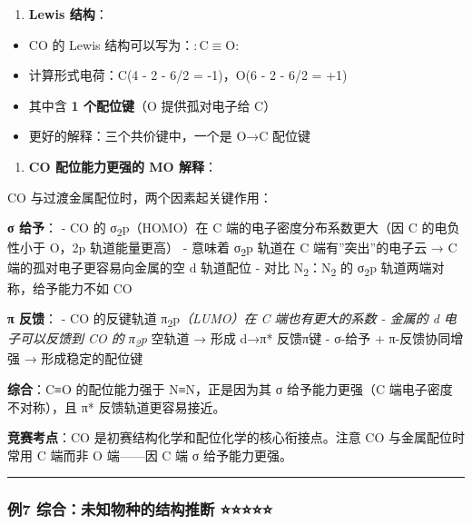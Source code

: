 \documentclass[a4paper,11pt]{ctexart}
\providecommand{\tightlist}{\setlength{\itemsep}{0pt}\setlength{\parskip}{0pt}}
\begin{document}
\begin{enumerate}
\def\labelenumi{(\arabic{enumi})}
\setcounter{enumi}{2}
\tightlist
\item
  \textbf{Lewis 结构}：
\end{enumerate}

\begin{itemize}
\tightlist
\item
  CO 的 Lewis 结构可以写为：\(\mathrm{:C≡O:}\)
\item
  计算形式电荷：C(4 - 2 - 6/2 = -1)，O(6 - 2 - 6/2 = +1)
\item
  其中含 \textbf{1 个配位键}（O 提供孤对电子给 C）
\item
  更好的解释：三个共价键中，一个是 O→C 配位键
\end{itemize}

\begin{enumerate}
\def\labelenumi{(\arabic{enumi})}
\setcounter{enumi}{3}
\tightlist
\item
  \textbf{CO 配位能力更强的 MO 解释}：
\end{enumerate}

CO 与过渡金属配位时，两个因素起关键作用：

\textbf{σ 给予}：
- CO 的 σ\textsubscript{2}p（HOMO）在 C 端的电子密度分布系数更大（因 C 的电负性小于 O，2p 轨道能量更高）
- 意味着 σ\textsubscript{2}p 轨道在 C 端有''突出''的电子云 → C 端的孤对电子更容易向金属的空 d 轨道配位
- 对比 N\textsubscript{2}：N\textsubscript{2} 的 σ\textsubscript{2}p 轨道两端对称，给予能力不如 CO

\textbf{π 反馈}：
- CO 的反键轨道 π\textsubscript{2}p\emph{（LUMO）在 C 端也有更大的系数
- 金属的 d 电子可以反馈到 CO 的 π\textsubscript{2}p} 空轨道 → 形成 d→π* 反馈π键
- σ-给予 + π-反馈协同增强 → 形成稳定的配位键

\textbf{综合}：C≡O 的配位能力强于 N≡N，正是因为其 σ 给予能力更强（C 端电子密度不对称），且 π* 反馈轨道更容易接近。

\textbf{竞赛考点}：CO 是初赛结构化学和配位化学的核心衔接点。注意 CO 与金属配位时常用 C 端而非 O 端------因 C 端 σ 给予能力更强。

\begin{center}\rule{0.5\linewidth}{0.5pt}\end{center}

\subsubsection{例7 综合：未知物种的结构推断 ⭐⭐⭐⭐⭐}\label{ux4f8b7-ux7efcux5408ux672aux77e5ux7269ux79cdux7684ux7ed3ux6784ux63a8ux65ad}
\end{document}

